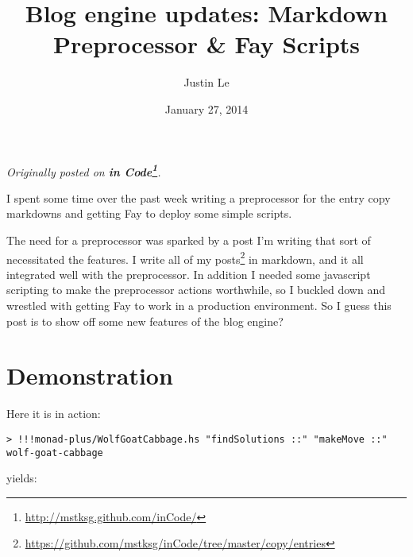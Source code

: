 \documentclass[]{article}
\title{Blog engine updates: Markdown Preprocessor \& Fay Scripts}
\author{Justin Le}
\date{January 27, 2014}
\newenvironment{Shaded}{}{}
\newcommand{\KeywordTok}[1]{\textcolor[rgb]{0.00,0.44,0.13}{\textbf{{#1}}}}
\newcommand{\DataTypeTok}[1]{\textcolor[rgb]{0.56,0.13,0.00}{{#1}}}
\newcommand{\CommentTok}[1]{\textcolor[rgb]{0.38,0.63,0.69}{\textit{{#1}}}}
\newcommand{\OtherTok}[1]{\textcolor[rgb]{0.00,0.44,0.13}{{#1}}}
\newcommand{\FunctionTok}[1]{\textcolor[rgb]{0.02,0.16,0.49}{{#1}}}
\newcommand{\NormalTok}[1]{{#1}}
\renewcommand{\href}[2]{#2\footnote{\url{#1}}}
\begin{document}
\maketitle

\emph{Originally posted on
\textbf{\href{http://mstksg.github.com/inCode/}{in Code}}.}

I spent some time over the past week writing a preprocessor for the
entry copy markdowns and getting Fay to deploy some simple scripts.

The need for a preprocessor was sparked by a post I'm writing that sort
of necessitated the features. I write
\href{https://github.com/mstksg/inCode/tree/master/copy/entries}{all of
my posts} in markdown, and it all integrated well with the preprocessor.
In addition I needed some javascript scripting to make the preprocessor
actions worthwhile, so I buckled down and wrestled with getting Fay to
work in a production environment. So I guess this post is to show off
some new features of the blog engine?

\section{Demonstration}\label{demonstration}

Here it is in action:

\begin{verbatim}
> !!!monad-plus/WolfGoatCabbage.hs "findSolutions ::" "makeMove ::" wolf-goat-cabbage
\end{verbatim}

yields:

\begin{Shaded}
\end{Shaded}
\end{document}
